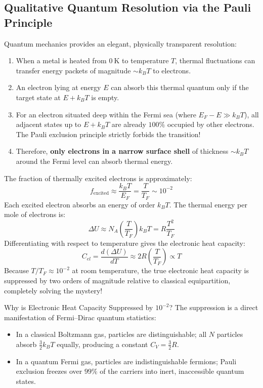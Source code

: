 \documentclass[11pt,a4paper]{article}
\begin{document}
\subsection{Qualitative Quantum Resolution via the Pauli Principle}
Quantum mechanics provides an elegant, physically transparent resolution:
\begin{enumerate}
    \item When a metal is heated from $0\ \mathrm{K}$ to temperature $T$, thermal fluctuations can transfer energy packets of magnitude $\sim k_B T$ to electrons.
    \item An electron lying at energy $E$ can absorb this thermal quantum only if the target state at $E + k_B T$ is empty.
    \item For an electron situated deep within the Fermi sea (where $E_F - E \gg k_B T$), all adjacent states up to $E + k_B T$ are already $100\%$ occupied by other electrons. The Pauli exclusion principle strictly forbids the transition!
    \item Therefore, \textbf{only electrons in a narrow surface shell} of thickness $\sim k_B T$ around the Fermi level can absorb thermal energy.
\end{enumerate}
The fraction of thermally excited electrons is approximately:
\begin{equation}
f_{\mathrm{excited}} \approx \frac{k_B T}{E_F} = \frac{T}{T_F} \sim 10^{-2}
\end{equation}
Each excited electron absorbs an energy of order $k_B T$. The thermal energy per mole of electrons is:
\begin{equation}
\Delta U \approx N_A \left(\frac{T}{T_F}\right) k_B T = R \frac{T^2}{T_F}
\end{equation}
Differentiating with respect to temperature gives the electronic heat capacity:
\begin{equation}
C_{el} = \frac{d(\Delta U)}{dT} \approx 2 R \left(\frac{T}{T_F}\right) \propto T
\label{eq:cv_qualitative}
\end{equation}
Because $T/T_F \approx 10^{-2}$ at room temperature, the true electronic heat capacity is suppressed by two orders of magnitude relative to classical equipartition, completely solving the mystery!

\begin{checkpointbox}{Why is Electronic Heat Capacity Suppressed by $10^{-2}$?}
The suppression is a direct manifestation of Fermi--Dirac quantum statistics:
\begin{itemize}
    \item In a classical Boltzmann gas, particles are distinguishable; all $N$ particles absorb $\frac{3}{2}k_B T$ equally, producing a constant $C_V = \frac{3}{2}R$.
    \item In a quantum Fermi gas, particles are indistinguishable fermions; Pauli exclusion freezes over $99\%$ of the carriers into inert, inaccessible quantum states.
\end{itemize}
\end{checkpointbox}
\end{document}
